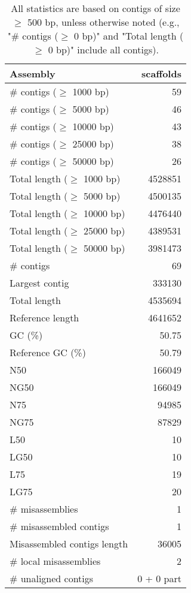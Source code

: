 \documentclass[12pt,a4paper]{article}
\begin{document}
\begin{table}[ht]
\begin{center}
\caption{All statistics are based on contigs of size $\geq$ 500 bp, unless otherwise noted (e.g., "\# contigs ($\geq$ 0 bp)" and "Total length ($\geq$ 0 bp)" include all contigs).}
\begin{tabular}{|l*{1}{|r}|}
\hline
Assembly & scaffolds \\ \hline
\# contigs ($\geq$ 1000 bp) & 59 \\ \hline
\# contigs ($\geq$ 5000 bp) & 46 \\ \hline
\# contigs ($\geq$ 10000 bp) & 43 \\ \hline
\# contigs ($\geq$ 25000 bp) & 38 \\ \hline
\# contigs ($\geq$ 50000 bp) & 26 \\ \hline
Total length ($\geq$ 1000 bp) & 4528851 \\ \hline
Total length ($\geq$ 5000 bp) & 4500135 \\ \hline
Total length ($\geq$ 10000 bp) & 4476440 \\ \hline
Total length ($\geq$ 25000 bp) & 4389531 \\ \hline
Total length ($\geq$ 50000 bp) & 3981473 \\ \hline
\# contigs & 69 \\ \hline
Largest contig & 333130 \\ \hline
Total length & 4535694 \\ \hline
Reference length & 4641652 \\ \hline
GC (\%) & 50.75 \\ \hline
Reference GC (\%) & 50.79 \\ \hline
N50 & 166049 \\ \hline
NG50 & 166049 \\ \hline
N75 & 94985 \\ \hline
NG75 & 87829 \\ \hline
L50 & 10 \\ \hline
LG50 & 10 \\ \hline
L75 & 19 \\ \hline
LG75 & 20 \\ \hline
\# misassemblies & 1 \\ \hline
\# misassembled contigs & 1 \\ \hline
Misassembled contigs length & 36005 \\ \hline
\# local misassemblies & 2 \\ \hline
\# unaligned contigs & 0 + 0 part \\ \hline

\end{tabular}
\end{center}
\end{table}
\end{document}
